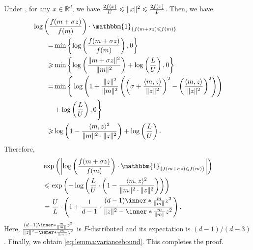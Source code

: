 \documentclass[journal]{IEEEtran}
\providecommand{\R}{\mathbb{R}} %
\providecommand{\E}{\mathbb{E}} %
\providecommand{\ind}[1]{\ensuremath{\mathbbm{1}_{\left\{#1\right\}}}} %
\renewcommand{\geq}{\geqslant} %
\renewcommand{\leq}{\leqslant} %
\DeclarePairedDelimiter{\norm}{\lVert}{\rVert}
\DeclarePairedDelimiter{\abs}{\lvert}{\rvert}
\theoremstyle{definition}
\begin{document}
Under , for any $x \in \R^d$, we have
$\frac{2 f(x)}{ U } \leq \norm{x}^2 \leq \frac{2 f(x)}{ L }$.
Then, we have
\begin{equation}
\begin{aligned}
\MoveEqLeft[3]
\log\left(\frac{f(m+\sigma z)}{f(m)}\right)\cdot\ind{f(m+\sigma z)\leq f(m)}
\\
=&
\min\left\{\log\left(\frac{f(m+\sigma z)}{f(m)}\right), 0 \right\}
\\
\geq&
\min\left\{
\log\left(\frac{\norm{m+\sigma z}^2}{\norm{m}^2}\right) + \log\left(\frac{L}{U}\right)
, 0 \right\}
\\
=&
\min\Bigg\{
\log\left(
1 + \frac{\norm{z}^2}{\norm{m}^2}\left(
\left(\sigma + \frac{\langle m, z \rangle}{\norm{z}^2}\right)^2
-\left(\frac{\langle m, z \rangle}{\norm{z}^2}\right)^2
\right)
\right) 
\\
&+ \log\left(\frac{L}{U}\right)
, 0 \Bigg\}
\\
\geq&
\log\left(
1 
-\frac{\langle m, z \rangle^2}{\norm{m}^2\cdot\norm{z}^2}
\right)
+ \log\left(\frac{L}{U}\right)
.
\end{aligned}
\end{equation}
Therefore,
\begin{equation}
\begin{aligned}[t]
&\exp\left(
\abs*{
\log\left(\frac{f(m+\sigma z)}{f(m)}\right)\cdot\ind{f(m+\sigma z)\leq f(m)}
}
\right)
\\
&\leq
\exp\left(
-
\log\left(
\frac{L}{U}\cdot\left(1 
-\frac{\langle m, z \rangle^2}{\norm{m}^2\cdot\norm{z}^2}
\right)
\right)
\right)
\\
&=
\frac{U}{L}\cdot \left( 1 + \frac{1}{d-1}\cdot \frac{(d-1) \inner*{\frac{m}{\norm{m}}}{z}^2}{\norm{z}^2-\inner*{\frac{m}{\norm{m}}}{z}^2}\right)
.
\end{aligned}
\end{equation}
Here, $\frac{(d-1) \inner*{\frac{m}{\norm{m}}}{z}^2}{\norm{z}^2-\inner*{\frac{m}{\norm{m}}}{z}^2}$ is $F$-distributed and its expectation is $(d-1) / (d-3)$. 
Finally, we obtain \eqref{eq:lemma:variancebound}.
This completes the proof.
\end{document}
